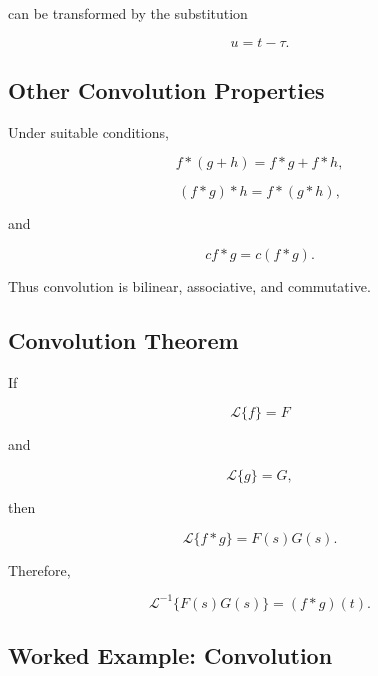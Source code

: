 can be transformed by the substitution

\[
u=t-\tau.
\]

\subsection{Other Convolution Properties}
\label{subsec:convolution-properties}

Under suitable conditions,

\[
\boxed{
f*(g+h)
=
f*g+f*h,
}
\]

\[
\boxed{
(f*g)*h
=
f*(g*h),
}
\]

and

\[
\boxed{
cf*g
=
c(f*g).
}
\]

Thus convolution is bilinear, associative, and commutative.

\subsection{Convolution Theorem}
\label{subsec:laplace-convolution-theorem}

If

\[
\mathcal{L}\{f\}=F
\]

and

\[
\mathcal{L}\{g\}=G,
\]

then

\[
\boxed{
\mathcal{L}\{f*g\}
=
F(s)G(s).
}
\]

Therefore,

\[
\boxed{
\mathcal{L}^{-1}
\{
F(s)G(s)
\}
=
(f*g)(t).
}
\]

\subsection{Worked Example: Convolution}
\label{subsec:worked-convolution}

